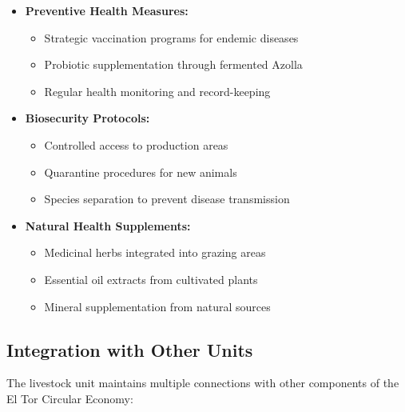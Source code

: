 \begin{itemize}
    \item \textbf{Preventive Health Measures:}
    \begin{itemize}
        \item Strategic vaccination programs for endemic diseases
        \item Probiotic supplementation through fermented Azolla
        \item Regular health monitoring and record-keeping
    \end{itemize}
    
    \item \textbf{Biosecurity Protocols:}
    \begin{itemize}
        \item Controlled access to production areas
        \item Quarantine procedures for new animals
        \item Species separation to prevent disease transmission
    \end{itemize}
    
    \item \textbf{Natural Health Supplements:}
    \begin{itemize}
        \item Medicinal herbs integrated into grazing areas
        \item Essential oil extracts from cultivated plants
        \item Mineral supplementation from natural sources
    \end{itemize}
\end{itemize}

\subsection{Integration with Other Units}

The livestock unit maintains multiple connections with other components of the El Tor Circular Economy:

